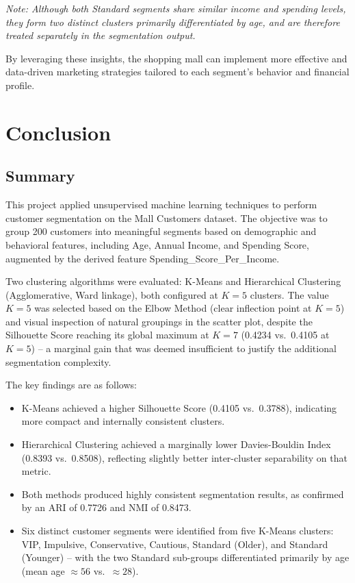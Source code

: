 \documentclass[12pt,a4paper]{article}
\begin{document}
\noindent\textit{Note: Although both Standard segments share similar income and spending levels, they form two distinct clusters primarily differentiated by age, and are therefore treated separately in the segmentation output.}

By leveraging these insights, the shopping mall can implement more effective and data-driven marketing strategies tailored to each segment's behavior and financial profile.


\section{Conclusion}

\subsection{Summary}

This project applied unsupervised machine learning techniques to perform customer segmentation on the Mall Customers dataset. The objective was to group 200 customers into meaningful segments based on demographic and behavioral features, including Age, Annual Income, and Spending Score, augmented by the derived feature Spending\_Score\_Per\_Income.

Two clustering algorithms were evaluated: K-Means and Hierarchical Clustering (Agglomerative, Ward linkage), both configured at $K = 5$ clusters. The value $K = 5$ was selected based on the Elbow Method (clear inflection point at $K = 5$) and visual inspection of natural groupings in the scatter plot, despite the Silhouette Score reaching its global maximum at $K = 7$ (0.4234 vs.\ 0.4105 at $K = 5$) -- a marginal gain that was deemed insufficient to justify the additional segmentation complexity.

The key findings are as follows:

\begin{itemize}
    \item K-Means achieved a higher Silhouette Score (0.4105 vs.\ 0.3788), indicating more compact and internally consistent clusters.
    \item Hierarchical Clustering achieved a marginally lower Davies-Bouldin Index (0.8393 vs.\ 0.8508), reflecting slightly better inter-cluster separability on that metric.
    \item Both methods produced highly consistent segmentation results, as confirmed by an ARI of 0.7726 and NMI of 0.8473.
    \item Six distinct customer segments were identified from five K-Means clusters: VIP, Impulsive, Conservative, Cautious, Standard (Older), and Standard (Younger) -- with the two Standard sub-groups differentiated primarily by age (mean age $\approx 56$ vs.\ $\approx 28$).
\end{itemize}
\end{document}
